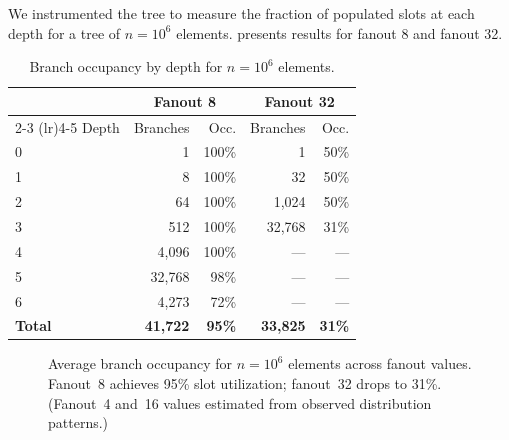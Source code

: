 \documentclass[11pt,twocolumn]{article}
\begin{document}
We instrumented the tree to measure the fraction of populated slots at each
depth for a tree of $n = 10^6$ elements.
 presents results for fanout 8 and fanout 32.

\begin{table}[h]
\centering
\caption{Branch occupancy by depth for $n = 10^6$ elements.}
\label{tab:occupancy}
\begin{tabular}{@{}lrrrr@{}}
\toprule
& \multicolumn{2}{c}{Fanout 8} & \multicolumn{2}{c}{Fanout 32} \\
\cmidrule(lr){2-3} \cmidrule(lr){4-5}
Depth & Branches & Occ. & Branches & Occ. \\
\midrule
0     & 1       & 100\% & 1       & 50\% \\
1     & 8       & 100\% & 32      & 50\% \\
2     & 64      & 100\% & 1,024   & 50\% \\
3     & 512     & 100\% & 32,768  & 31\% \\
4     & 4,096   & 100\% & ---     & --- \\
5     & 32,768  & 98\%  & ---     & --- \\
6     & 4,273   & 72\%  & ---     & --- \\
\midrule
\textbf{Total} & \textbf{41,722} & \textbf{95\%} & \textbf{33,825} & \textbf{31\%} \\
\bottomrule
\end{tabular}
\end{table}

\begin{figure}[h]
\centering
{}
\caption{Average branch occupancy for $n = 10^6$ elements across fanout
  values. Fanout~8 achieves 95\% slot utilization; fanout~32 drops to 31\%.
  (Fanout~4 and~16 values estimated from observed distribution patterns.)}
\label{fig:occupancy}
\end{figure}
\end{document}
